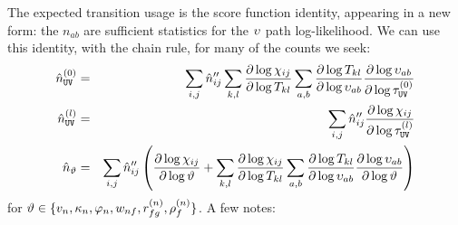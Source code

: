 The expected transition usage is the score function identity, appearing in a new form: the $n_{ab}$ are sufficient statistics for the $\upsilon$ path log-likelihood.
We can use this identity, with the chain rule, for many of the counts we seek:
\begin{eqnarray}
\hat{n}^{(0)}_{{\tt U}{\tt V}} & = & \sum_{i,j} \hat{n}''_{ij} \sum_{k,l} \frac{\partial \log \chi_{ij}}{\partial \log T_{kl}} \sum_{a,b} \frac{\partial \log T_{kl}}{\partial \log \upsilon_{ab}} \frac{\partial \log \upsilon_{ab}}{\partial \log \tau^{(0)}_{{\tt U}{\tt V}}} \label{eq:main-counts} \\
\hat{n}^{(l)}_{{\tt U}{\tt V}} & = & \sum_{i,j} \hat{n}''_{ij} \frac{\partial \log \chi_{ij}}{\partial \log \tau^{(l)}_{{\tt U}{\tt V}}} \label{eq:domain-counts} \\
\hat{n}_{\vartheta} & = & \sum_{i,j} \hat{n}''_{ij} \left( \frac{\partial \log \chi_{ij}}{\partial \log \vartheta} + \sum_{k,l} \frac{\partial \log \chi_{ij}}{\partial \log T_{kl}} \sum_{a,b} \frac{\partial \log T_{kl}}{\partial \log \upsilon_{ab}} \frac{\partial \log \upsilon_{ab}}{\partial \log \vartheta} \right) \label{eq:var-counts}
\end{eqnarray}
for $\vartheta \in \{ v_n, \kappa_n, \varphi_n, w_{nf}, r^{(n)}_{fg}, \rho^{(n)}_f \}$.
A few notes:
